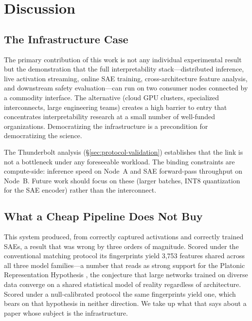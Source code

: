 \documentclass[11pt]{article}
\begin{document}
\section{Discussion}
\label{sec:discussion}

\subsection{The Infrastructure Case}

The primary contribution of this work is not any individual experimental result but the demonstration that the full interpretability stack---distributed inference, live activation streaming, online SAE training, cross-architecture feature analysis, and downstream safety evaluation---can run on two consumer nodes connected by a commodity interface. The alternative (cloud GPU clusters, specialized interconnects, large engineering teams) creates a high barrier to entry that concentrates interpretability research at a small number of well-funded organizations. Democratizing the infrastructure is a precondition for democratizing the science.

The Thunderbolt analysis (\S\ref{sec:protocol-validation}) establishes that the link is not a bottleneck under any foreseeable workload. The binding constraints are compute-side: inference speed on Node~A and SAE forward-pass throughput on Node~B. Future work should focus on these (larger batches, INT8 quantization for the SAE encoder) rather than the interconnect.

\subsection{What a Cheap Pipeline Does Not Buy}
\label{sec:pipeline-limits}

This system produced, from correctly captured activations and correctly trained SAEs, a result that was wrong by three orders of magnitude. Scored under the conventional matching protocol its fingerprints yield 3,753 features shared across all three model families---a number that reads as strong support for the Platonic Representation Hypothesis \citep{huh2024platonic}, the conjecture that large networks trained on diverse data converge on a shared statistical model of reality regardless of architecture. Scored under a null-calibrated protocol the same fingerprints yield one, which bears on that hypothesis in neither direction. We take up what that says about a paper whose subject is the infrastructure.
\end{document}
